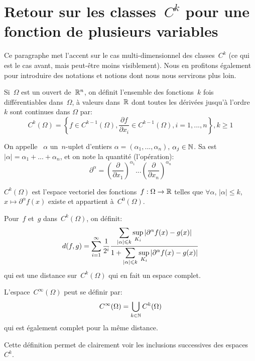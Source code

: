 \medskip
\section{Retour sur les classes~$C^k$ pour une fonction de plusieurs variables}\label{Sec-Ck}

Ce paragraphe met l'accent sur le cas multi-dimensionnel des classes~$C^k$ (ce qui est le cas avant, mais peut-être moins visiblement). Nous en profitons également pour introduire des notations et notions dont nous nous servirons plus loin.

\medskip
\begin{definition}
Si~$\Omega$ est un ouvert de~$\mathbb R^n$, on définit l'ensemble des fonctions~$k$ fois différentiables dans~$\Omega$, à valeurs dans~$\mathbb R$ dont toutes les dérivées jusqu'à l'ordre~$k$ sont continues dans $\Omega$ par:
\begin{equation}
C^k(\Omega) = \left\{f\in C^{k-1}(\Omega), \dfrac{\partial f}{\partial x_i}\in C^{k-1}(\Omega),
i=1, ..., n\right\}, k\ge 1
\end{equation}
\end{definition}

\medskip
\begin{definition}
On appelle ~$\alpha$ un~$n$-uplet d'entiers $\alpha=(\alpha_1, ..., \alpha_n)$, $\alpha_j\in\mathbb N$.
Sa  est~$|\alpha|=\alpha_1+ ... + \alpha_n$, et on note  la quantité (l'opération):
\begin{equation}
   \partial^\alpha=\left(\dfrac{\partial}{\partial x_1}\right)^{\alpha_1}...\left(\dfrac{\partial}{\partial x_n}\right)^{\alpha_n}\end{equation}
\end{definition}

\begin{remarque}
$C^k(\Omega)$ est l'espace vectoriel des fonctions~$f: \Omega \to \mathbb R$ telles que $\forall \alpha$, $|\alpha|\le k$, $x\mapsto \partial^\alpha f(x)$ existe et appartient à~$C^0(\Omega)$.

Pour~$f$ et~$g$ dans~$C^k(\Omega)$, on définit:
\begin{equation}
d(f,g)=\dsum_{i=1}^\infty \dfrac1{2^i}\dfrac{\dsum_{|\alpha|\le k} \sup_{K_i}|\partial^\alpha f(x)-g(x)|}{%
1+\dsum_{|\alpha|\le k} \sup_{K_i}|\partial^\alpha f(x)-g(x)|}
\end{equation}
qui est une distance sur~$C^k(\Omega)$ qui en fait un espace complet. 

L'espace~$C^\infty(\Omega)$ peut se définir par:
\begin{equation} C^\infty(\Omega)=\bigcup\limits_{k\in\mathbb N}C^k(\Omega)\end{equation}
qui est également complet pour la même distance.

Cette définition permet de clairement voir les inclusions successives des espaces~$C^k$.
\end{remarque}

